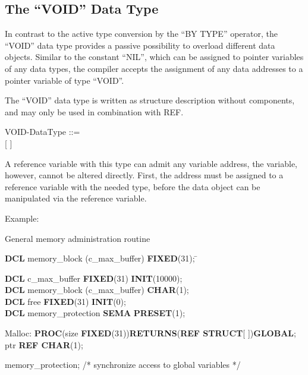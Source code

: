 \begin{removed}
\subsection{The ``VOID'' Data Type}    %

In contrast to the active type conversion by the ``BY TYPE'' operator,
the ``VOID'' data type provides a passive possibility to overload
different data objects. Similar to the constant ``NIL'', which can be
assigned to pointer variables of any data types, the compiler accepts
the assignment of any data addresses to a pointer variable of type
``VOID''.

The ``VOID'' data type is written as structure description without
components, and may only be used in combination with REF.

\begin{front}
VOID-DataType ::=\\
 [ ]
\end{front}
\begin{grammar}

\end{grammar}

A reference variable with this type can admit any variable address, the
variable, however, cannot be altered directly. First, the address must
be assigned to a reference variable with the needed type, before the
data object can be manipulated via the reference variable.

Example:

General memory administration routine

\begin{tabbing}
{\bf DCL} memory\_block (c\_max\_buffer) \= {\bf FIXED}(31); \= \kill

{\bf DCL} c\_max\_buffer  \> {\bf FIXED}(31)  \> {\bf INIT}(10000);\\
{\bf DCL} memory\_block (c\_max\_buffer) \> {\bf CHAR}(1);   \> \\
{\bf DCL} free                           \> {\bf FIXED}(31)  \> {\bf INIT}(0);\\
{\bf DCL} memory\_protection             \> {\bf SEMA}       \> {\bf PRESET}(1);
\end{tabbing}

Malloc: {\bf PROC}(size {\bf FIXED}(31)){\bf RETURNS}({\bf REF STRUCT}[ ]){\bf GLOBAL};\\
 ptr {\bf REF CHAR}(1);

 memory\_protection; \x /* synchronize access to global variables */


\end{removed}
